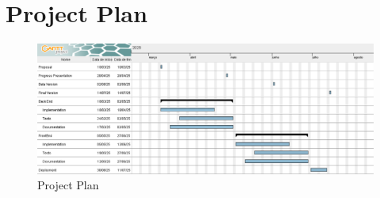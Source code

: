\documentclass[a4paper,twoside,11pt]{article}
\begin{document}
\section*{Project Plan}

\begin{figure}[h]
    \centering
    \includegraphics[width=\textwidth]{ProjectPlan.png}
    \caption{Project Plan}
    \label{fig:project-plan}
\end{figure}



\end{document}
